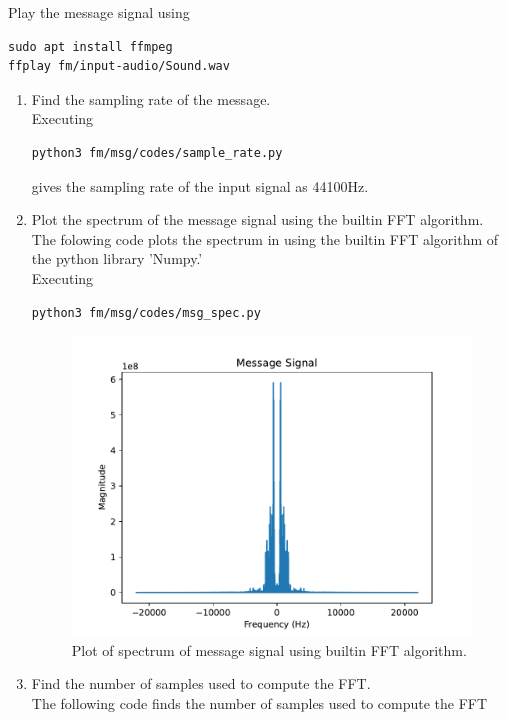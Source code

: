 Play the message signal using
\begin{lstlisting}
sudo apt install ffmpeg
ffplay fm/input-audio/Sound.wav
\end{lstlisting}
\begin{enumerate}[label=\arabic*.,ref=\thesection.\theenumi]
\item Find the sampling rate of the message.
\\
	\solution
Executing	
\begin{lstlisting}
python3 fm/msg/codes/sample_rate.py
\end{lstlisting}
gives
the sampling rate of the input signal as 44100Hz.
\item Plot the spectrum of the message signal using the builtin FFT algorithm.\\
	\solution
The folowing code plots the spectrum in  using the builtin FFT algorithm of the python library 'Numpy.'
\\
Executing
\begin{lstlisting}
python3 fm/msg/codes/msg_spec.py
\end{lstlisting}		
\begin{figure}[H]
\centering
\includegraphics[width=\columnwidth]{fm/msg/figs/msg_spec.pdf}
\caption{Plot of spectrum of message signal using builtin FFT algorithm.}
\label{fig:FFTb}
\end{figure}
\item Find the number of samples used to compute the FFT.\\
	\solution
The following code finds the number of samples used to compute the FFT

\end{enumerate}
